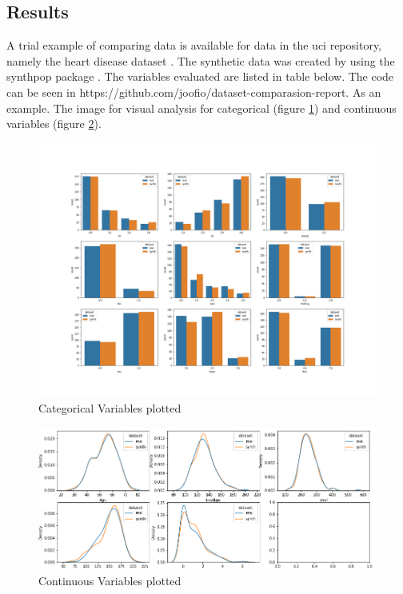 \subsection{Results}
A trial example of comparing data is available for data in the \ac{uci} repository, namely the heart disease dataset \cite{misc_heart_disease_45}. The synthetic data was created by using the synthpop package \cite{synthpop}. The variables evaluated are listed in table below. The code can be seen in https://github.com/joofio/dataset-comparasion-report. As an example. The image for visual analysis for categorical (figure \ref{fig:catgorical}) and continuous variables (figure \ref{fig:continuous}).


\begin{figure}[H]
    \centering
    \includegraphics[scale=0.23]{figures/cat.png}
    \caption{Categorical Variables plotted}
    \label{fig:catgorical}
\end{figure}

\begin{figure}[t]
    \centering
    \includegraphics[width=\textwidth]{figures/continuous_plot_0.png}
    \caption{Continuous Variables plotted}
    \label{fig:continuous}
\end{figure}




